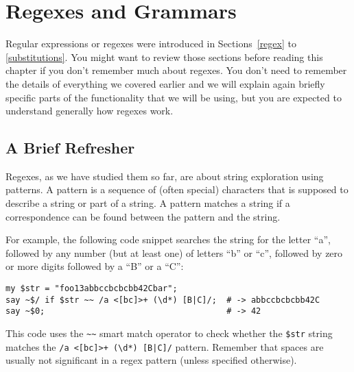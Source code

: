 


\chapter{Regexes and Grammars}
\label{regex_grammars}

Regular expressions or regexes were introduced in
Sections~\ref{regex} to \ref{substitutions}. You might want to review
those sections before reading this chapter if you don't
remember much about regexes. You don't need to remember the details of
everything we covered earlier and we will explain again briefly
specific parts of the functionality that we will be using, but you are
expected to understand generally how regexes work.

\section{A Brief Refresher}

Regexes, as we have studied 
them so far, are about string exploration using patterns. 
A pattern is a sequence of (often special) characters that 
is supposed to describe a string or part of a string. A 
pattern matches a string if a correspondence can be found 
between the pattern and the string. 

For example, the 
following code snippet searches the string for the letter 
``a'', followed by any number (but at least one) of letters 
``b'' or ``c'', followed by zero or more digits followed by
a ``B'' or a ``C'':

\begin{verbatim}
my $str = "foo13abbccbcbcbb42Cbar";
say ~$/ if $str ~~ /a <[bc]>+ (\d*) [B|C]/;  # -> abbccbcbcbb42C
say ~$0;                                     # -> 42
\end{verbatim}

This code uses the \verb'~~' smart match operator to 
check whether the \verb'$str' string matches the 
\verb'/a <[bc]>+ (\d*) [B|C]/' pattern. Remember that 
spaces are usually not significant in a regex pattern 
(unless specified otherwise).

